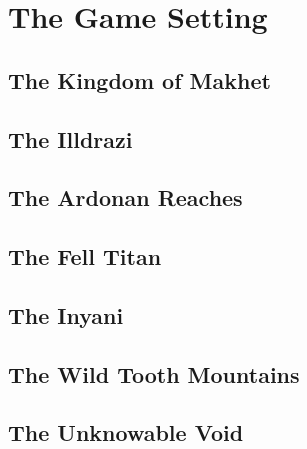 \chapter{The Game Setting}

\begin{multicols}{2}

\section{The Kingdom of Makhet}

\section{The Illdrazi}

\section{The Ardonan Reaches}

\section{The Fell Titan}

\section{The Inyani}

\section{The Wild Tooth Mountains}

\section{The Unknowable Void}

\end{multicols}
